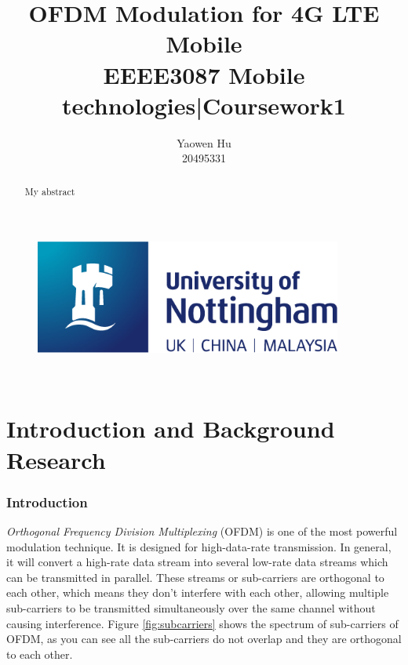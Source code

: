\documentclass{article}
\title{\vspace{20 pt}\huge{OFDM Modulation for 4G LTE Mobile}\\\vspace{10 pt}\large{EEEE3087 Mobile technologies|Coursework1}\vspace{20 pt}}
\author{\huge{Yaowen Hu}\\{\small 20495331}}
\date{}
\numberwithin{figure}{section}
\begin{document}

\begin{titlepage}
\begin{figure}
    \vspace{-4em}
    \centering
    \includegraphics[width=0.9\textwidth]{images/logo.png}
\end{figure}

\vfill
\maketitle
\vfill

\\
\vspace{10 pt}
\centering{\today}
\thispagestyle{empty}
\pagebreak
\end{titlepage}


\tableofcontents
\thispagestyle{empty}
\pagebreak


\begin{abstract}
My abstract
\setcounter{page}{1}
\thispagestyle{empty}
\pagebreak
\end{abstract}


\part{Introduction and Background Research}

\pagestyle{plain}
\setcounter{page}{1}

\section{Introduction}
\textit{Orthogonal Frequency Division Multiplexing} (OFDM) is one of the most powerful modulation technique. It is designed for high-data-rate transmission. In general, it will convert a high-rate data stream into several low-rate data streams which can be transmitted in parallel\cite{RN79}. These streams or sub-carriers are orthogonal to each other, which means they don't interfere with each other, allowing multiple sub-carriers to be transmitted simultaneously over the same channel without causing interference. Figure \ref{fig:subcarriers} shows the spectrum of sub-carriers of OFDM, as you can see all the sub-carriers do not overlap and they are orthogonal to each other.
\end{document}
